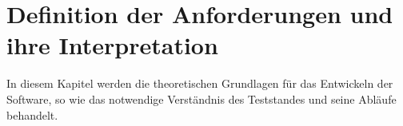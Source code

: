 \newpage
\section{Definition der Anforderungen und ihre Interpretation}
\label{sec:definition-der-anforderungen-und-ihre-interpretation}


In diesem Kapitel werden die theoretischen Grundlagen für das Entwickeln der Software,
so wie das notwendige Verständnis des Teststandes und seine Abläufe behandelt.





